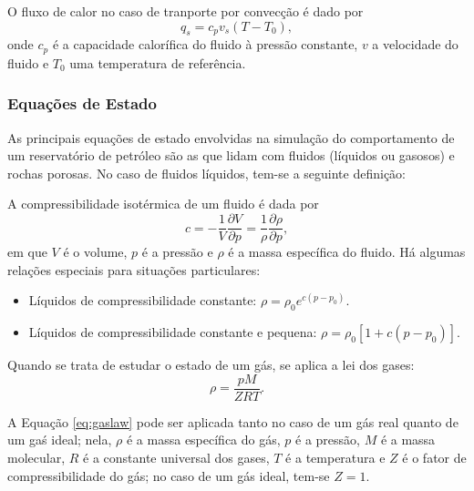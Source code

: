 \begin{theorem}[Convec\c{c}\~{a}o]
O fluxo de calor no caso de tranporte por convec\c{c}\~{a}o \'{e} dado por
\begin{equation}
	q_s = c_p v_s (T - T_0),
\end{equation}
onde $c_p$ \'{e} a capacidade calor\'{i}fica do fluido \`{a} press\~{a}o constante, $v$ a velocidade do fluido e $T_0$ uma temperatura de refer\^{e}ncia.
\end{theorem}

\subsubsection{Equa\c{c}\~{o}es de Estado}
As principais equa\c{c}\~{o}es de estado envolvidas na simula\c{c}\~{a}o do comportamento de um reservat\'{o}rio de petr\'{o}leo s\~{a}o as que lidam com fluidos (l\'{i}quidos ou gasosos) e rochas porosas. No caso de fluidos l\'{i}quidos, tem-se a seguinte defini\c{c}\~{a}o:

\begin{definition}
A compressibilidade isot\'{e}rmica de um fluido \'{e} dada por
\begin{equation}
	c = -\frac{1}{V}\frac{\partial V}{\partial p} = \frac{1}{\rho}\frac{\partial \rho}{\partial p},
\end{equation}
em que $V$ \'{e} o volume, $p$ \'{e} a press\~{a}o e $\rho$ \'{e} a massa espec\'{i}fica do fluido. H\'{a} algumas rela\c{c}\~{o}es especiais para situa\c{c}\~{o}es particulares:
\begin{itemize}
\item L\'{i}quidos de compressibilidade constante: $\rho = \rho_0 e^{c(p-p_0)}$.
\item L\'{i}quidos de compressibilidade constante e pequena: $\rho = \rho_0 \left[1+c\left(p-p_0\right)\right]$.
\end{itemize}
\end{definition}

Quando se trata de estudar o estado de um g\'{a}s, se aplica a lei dos gases:
\begin{equation}\label{eq:gaslaw}
	\rho = \frac{pM}{ZRT}.
\end{equation}

A Equa\c{c}\~{a}o \eqref{eq:gaslaw} pode ser aplicada tanto no caso de um g\'{a}s real quanto de um gaś ideal; nela, $\rho$ \'{e} a massa espec\'{i}fica do g\'{a}s, $p$ \'{e} a press\~{a}o, $M$ \'{e} a massa molecular, $R$ \'{e} a constante universal dos gases, $T$ \'{e} a temperatura e $Z$ \'{e} o fator de compressibilidade do g\'{a}s; no caso de um g\'{a}s ideal, tem-se $Z = 1$.

